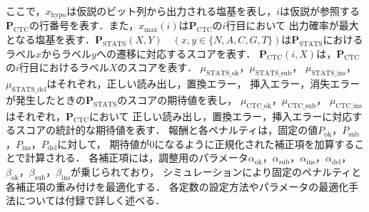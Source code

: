 \documentclass[sotsuron]{kuee}
\begin{document}
ここで，$x_{\mathrm{hypo}}$は仮説のビット列から出力される塩基を表し，$i$は仮説が参照する
$\bm{P}_{\mathrm{CTC}}$の行番号を表す．また，$x_{\mathrm{max}}(i)$は$\bm{P}_{\mathrm{CTC}}$の$i$行目において
出力確率が最大となる塩基を表す．$\bm{P}_{\mathrm{STATS}}(X,Y)\quad(x,y\in \{N,A,C,G,T\})$は$\bm{P}_{\mathrm{STATS}}$における
ラベル$x$からラベル$y$への遷移に対応するスコアを表す．
$\bm{P}_{\mathrm{CTC}}(i,X)$は，$\bm{P}_{\mathrm{CTC}}$の$i$行目におけるラベル$X$のスコアを表す．
$\mu_{\mathrm{STATS}\_\mathrm{ok}}$，$\mu_{\mathrm{STATS}\_\mathrm{sub}}$，
$\mu_{\mathrm{STATS}\_\mathrm{ins}}$，$\mu_{\mathrm{STATS}\_\mathrm{del}}$はそれぞれ，正しい読み出し，置換エラー，
挿入エラー，消失エラーが発生したときの$\bm{P}_{\mathrm{STATS}}$のスコアの期待値を表し，
$\mu_{\mathrm{CTC}\_\mathrm{ok}}$，$\mu_{\mathrm{CTC}\_\mathrm{sub}}$，
$\mu_{\mathrm{CTC}\_\mathrm{ins}}$はそれぞれ，$\bm{P}_{\mathrm{CTC}}$において
正しい読み出し，置換エラー，挿入エラーに対応するスコアの統計的な期待値を表す．
報酬と各ペナルティは，固定の値$P_{\mathrm{ok}}$，$P_{\mathrm{sub}}$，$P_{\mathrm{ins}}$，$P_{\mathrm{del}}$に対して，
期待値が0になるように正規化された補正項を加算することで計算される．
各補正項には，調整用のパラメータ$\alpha_{\mathrm{ok}}$，$\alpha_{\mathrm{sub}}$，$\alpha_{\mathrm{ins}}$，$\alpha_{\mathrm{del}}$，
$\beta_{\mathrm{ok}}$，$\beta_{\mathrm{sub}}$，$\beta_{\mathrm{ins}}$が乗じられており，
シミュレーションにより固定のペナルティと各補正項の重み付けを最適化する．
各定数の設定方法やパラメータの最適化手法については付録で詳しく述べる．
\end{document}
